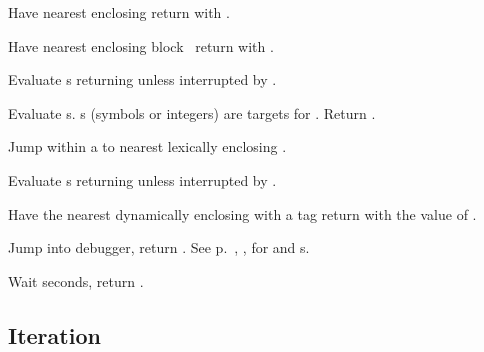 \begin{LIST}{1cm}
  {
  Have nearest enclosing   return with
  . 
  }

  {
  Have nearest enclosing block \NIL\ return with .
  }

  {Evaluate s returning
   unless interrupted by .
  }

  {
  Evaluate s. s (symbols or integers) are targets
  for . Return \retval{\NIL}. 
  }

  {Jump within a  to nearest
  lexically enclosing  .
  }

  {Evaluate s returning
   unless interrupted by .
  }

  {Have the nearest dynamically
  enclosing  with a tag   return with the
  value of .
  }

  {
  Jump into debugger, return \retval{\NIL}.
  See p.\ \pageref{section:Format}, , for 
  and s. 
  }

  {Wait  seconds, return \retval{\NIL}.
    }

\end{LIST}



\subsection{Iteration}

